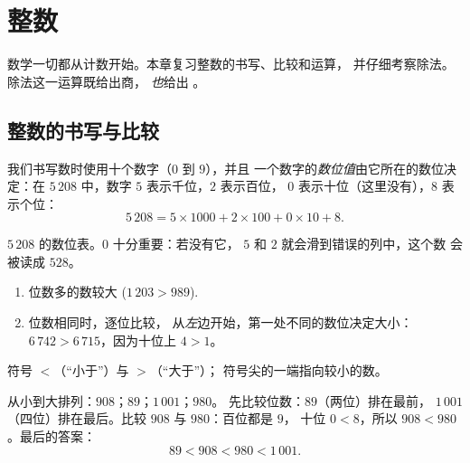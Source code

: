 \chapter{整数}\label{ch:g6:wholes}

数学一切都从计数开始。本章复习整数的书写、比较和运算，
并仔细考察除法。除法这一运算既给出商，
\emph{也}给出
。

\section{整数的书写与比较}

\begin{definition}[数位值]\label{def:g6:wholes:place}
我们书写数时使用十个数字（$0$ 到 $9$），并且
一个数字的\emph{数位值}由它所在的数位决定：在
$5\,208$ 中，数字 $5$ 表示千位，$2$ 表示百位，
$0$ 表示十位（这里没有），$8$ 表示个位：
\[
5\,208 = 5 \times 1000 + 2 \times 100 + 0 \times 10 + 8 .
\]
\end{definition}

\begin{omfigure}

{\small $5\,208$ 的数位表。$0$ 十分重要：若没有它，
$5$ 和 $2$ 就会滑到错误的列中，这个数
会被读成 $528$。}
\end{omfigure}

\begin{method}[比较两个整数]\label{met:g6:wholes:compare}
\begin{enumerate}
  \item 位数多的数较大
        ($1\,203 > 989$).
  \item 位数相同时，逐位比较，
        从\emph{左}边开始，第一处不同的数位决定大小：
        $6\,742 > 6\,715$，因为十位上 $4 > 1$。
\end{enumerate}
符号 $<$（“小于”）与 $>$（“大于”）；
符号尖的一端指向较小的数。
\end{method}

\begin{example}\label{ex:g6:wholes:order}
从小到大排列：$908$；$89$；$1\,001$；$980$。
先比较位数：$89$（两位）排在最前，
$1\,001$（四位）排在最后。比较 $908$ 与 $980$：百位都是 $9$，
十位 $0 < 8$，所以 $908 < 980$。最后的答案：
\[
89 < 908 < 980 < 1\,001 .
\]
\end{example}

